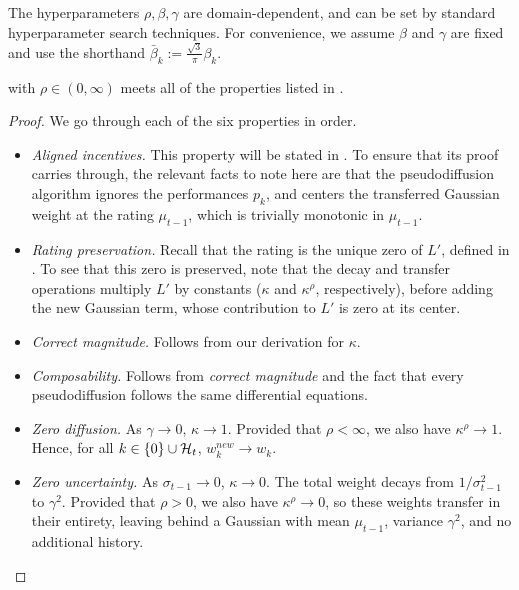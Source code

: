 The hyperparameters $\rho,\beta,\gamma$ are domain-dependent, and can be set by standard hyperparameter search techniques. For convenience, we assume $\beta$ and $\gamma$ are fixed and use the shorthand $\bar\beta_k := \frac{\sqrt{3}}{\pi} \beta_k$.

\begin{theorem}
\label{thm:diffuse-prop}
 with $\rho\in(0,\infty)$ meets all of the properties listed in .
\end{theorem}

\begin{proof}
We go through each of the six properties in order.
\begin{itemize}[leftmargin=*]
    \item \emph{Aligned incentives.} This property will be stated in . To ensure that its proof carries through, the relevant facts to note here are that the pseudodiffusion algorithm ignores the performances $p_k$, and centers the transferred Gaussian weight at the rating $\mu_{t-1}$, which is trivially monotonic in $\mu_{t-1}$.
    \item \emph{Rating preservation.} Recall that the rating is the unique zero of $L'$, defined in . To see that this zero is preserved, note that the decay and transfer operations multiply $L'$ by constants ($\kappa$ and $\kappa^\rho$, respectively), before adding the new Gaussian term, whose contribution to $L'$ is zero at its center.
    \item \emph{Correct magnitude.} Follows from our derivation for $\kappa$.
    \item \emph{Composability.} Follows from \emph{correct magnitude} and the fact that every pseudodiffusion follows the same differential equations.
    \item \emph{Zero diffusion.} As $\gamma\rightarrow 0$, $\kappa\rightarrow 1$. Provided that $\rho<\infty$, we also have $\kappa^\rho\rightarrow 1$. Hence, for all $k\in\{0\}\cup{\mathcal{H}}_t$, $w_k^{new} \rightarrow w_k$.
    \item \emph{Zero uncertainty.} As $\sigma_{t-1}\rightarrow 0$, $\kappa\rightarrow 0$. The total weight decays from $1/\sigma_{t-1}^2$ to $\gamma^2$. Provided that $\rho > 0$, we also have $\kappa^\rho\rightarrow 0$, so these weights transfer in their entirety, leaving behind a Gaussian with mean $\mu_{t-1}$, variance $\gamma^2$, and no additional history. \qedhere
\end{itemize}
\end{proof}

